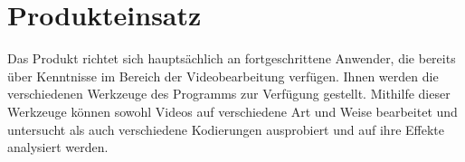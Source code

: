 \section{Produkteinsatz}

Das Produkt richtet sich hauptsächlich an fortgeschrittene Anwender, die bereits über Kenntnisse im Bereich der Videobearbeitung verfügen. Ihnen werden die verschiedenen Werkzeuge des Programms zur Verfügung gestellt. Mithilfe dieser Werkzeuge können sowohl Videos auf verschiedene Art und Weise bearbeitet und untersucht als auch verschiedene Kodierungen ausprobiert und auf ihre Effekte analysiert werden.
